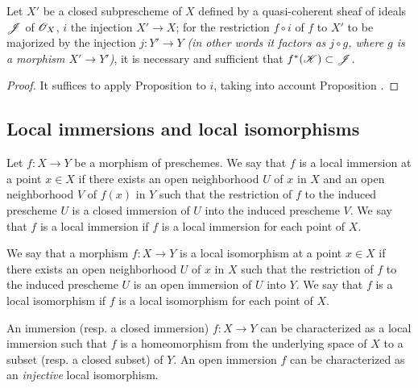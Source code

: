 \begin{cor}[4.4.6]
\label{1.4.4.6}
Let $X'$ be a closed subprescheme of $X$ defined by a quasi-coherent sheaf of ideals $\mathscr{J}$ of $\mathscr{O}_X$, $i$ the injection $X'\to X$; for the restriction $f\circ i$ of $f$ to $X'$ to be majorized by the injection $j:Y'\to Y$ \emph{(in other words it factors as $j\circ g$, where $g$ is a morphism $X'\to Y'$)}, it is necessary and sufficient that $f^*(\mathscr{K})\subset\mathscr{J}$.
\end{cor}

\begin{proof}
\label{proof-1.4.4.6}
It suffices to apply Proposition  to $i$, taking into account Proposition .
\end{proof}

\subsection{Local immersions and local isomorphisms}
\label{subsection-local-immersions-isomorphisms}

\begin{defn}[4.5.1]
\label{1.4.5.1}
Let $f:X\to Y$ be a morphism of preschemes.
We say that $f$ is a local immersion at a point $x\in X$ if there exists an open neighborhood $U$ of $x$ in $X$ and an open neighborhood $V$ of $f(x)$ in $Y$ such that the restriction of $f$ to the induced prescheme $U$ is a closed immersion of $U$ into the induced prescheme $V$.
We say that $f$ is a local immersion if $f$ is a local immersion for each point of $X$.
\end{defn}

\begin{defn}[4.5.2]
\label{1.4.5.2}
We say that a morphism $f:X\to Y$ is a local isomorphism at
a point $x\in X$ if there exists an open neighborhood $U$ of $x$ in $X$ such that the restriction of $f$ to the induced prescheme $U$ is an open immersion of $U$ into $Y$.
We say that $f$ is a local isomorphism if $f$ is a local isomorphism for each point of $X$.
\end{defn}

\begin{env}[4.5.3]
\label{1.4.5.3}
An immersion (resp. a closed immersion) $f:X\to Y$ can be characterized as a local immersion such that $f$ is a homeomorphism from the underlying space of $X$ to a subset (resp. a closed subset) of $Y$.
An open immersion $f$ can be characterized as an \emph{injective} local isomorphism.
\end{env}

